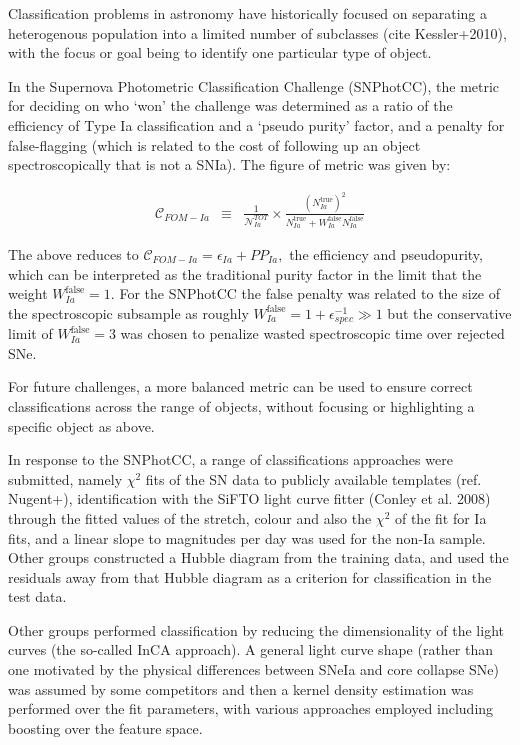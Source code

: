 Classification problems in astronomy have historically focused on separating a heterogenous population into a limited number of subclasses (cite Kessler+2010), with the focus or goal being to identify one particular type of object.

In the Supernova Photometric Classification Challenge (SNPhotCC), the metric for deciding on who `won' the challenge was determined as a ratio of the efficiency of Type Ia classification and a `pseudo purity' factor, and a penalty for false-flagging (which is related to the cost of following up an object spectroscopically that is not a SNIa). The figure of metric was given by:

\begin{eqnarray}
\mathcal{C}_{FOM-Ia} &\equiv& \frac{1}{\mathcal{N}_{Ia}^{TOT}}\times \frac{(N_{Ia}^{\mathrm{true}})^2}{N_{Ia}^\mathrm{true}+W_{Ia}^\mathrm{false}N_{Ia}^\mathrm{false}}
\end{eqnarray}

The above reduces to $\mathcal{C}_{FOM-Ia}  = \epsilon_{Ia} + PP_{Ia},$ the efficiency and pseudopurity, which can be interpreted as the traditional purity factor in the limit that the weight $W_{Ia}^\mathrm{false} = 1$. For the SNPhotCC the false penalty was related to the size of the spectroscopic subsample as roughly $W_{Ia}^\mathrm{false} = 1 + \epsilon_{spec}^{-1} \gg 1$ but the conservative limit of $W_{Ia}^\mathrm{false} = 3$ was chosen to penalize wasted spectroscopic time over rejected SNe.

For future challenges, a more balanced metric can be used to ensure correct classifications across the range of objects, without focusing or highlighting a specific object as above.



In response to the SNPhotCC, a range of classifications approaches were submitted, namely $\chi^{2}$ fits of the SN data to publicly available templates (ref. Nugent+), identification with the SiFTO light curve fitter (Conley et al. 2008) through the fitted values of the stretch, colour and also the $\chi^{2}$ of the fit for Ia fits, and a linear slope to magnitudes per day was used for the non-Ia sample. Other groups constructed a Hubble diagram from the training data, and used the residuals away from that Hubble diagram as a criterion for classification in the test data.

Other groups performed classification by reducing the dimensionality of the light curves (the so-called InCA approach). A general light curve shape (rather than one motivated by the physical differences between SNeIa and core collapse SNe) was assumed by some competitors and then a kernel density estimation was performed over the fit parameters, with various approaches employed including boosting over the feature space.


